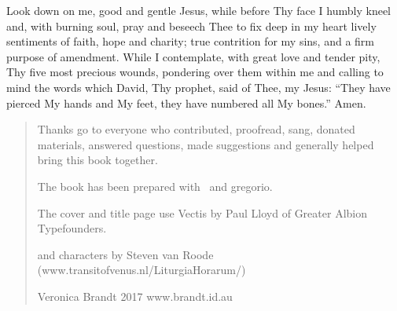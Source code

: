 \begin{center}
\begin{minipage}{5.8cm}

Look down on me, good and gentle Jesus,
while before Thy face I humbly kneel and,
with burning soul,
pray and beseech Thee
to fix deep in my heart lively sentiments
of faith, hope and charity;
true contrition for my sins,
and a firm purpose of amendment.
While I contemplate,
with great love and tender pity,
Thy five most precious wounds,
pondering over them within me
and calling to mind the words which David,
Thy prophet, said of Thee, my Jesus:
``They have pierced My hands and My feet,
they have numbered all My bones.''
Amen.
\end{minipage}
\end{center}

\vfill

\begin{quote}


Thanks go to everyone who contributed, proofread, sang, donated materials, answered questions, made suggestions and generally helped bring this book together.

The book has been prepared with \LuaLaTeX\ and gregorio. 



The cover and title page use Vectis by Paul Lloyd of Greater Albion Typefounders.

\Vbar and \Rbar characters by Steven van Roode\\
(www.transitofvenus.nl/LiturgiaHorarum/)

Veronica Brandt 2017 www.brandt.id.au

\end{quote}

